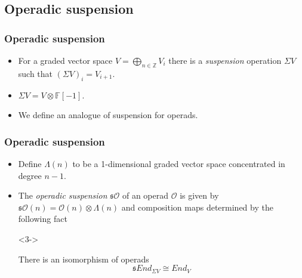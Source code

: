 \documentclass{beamer}
\theoremstyle{definition}
\newcommand{\Z}{\mathbb{Z}}
\begin{document}
\subsection{Operadic suspension}
\begin{frame}
\frametitle{Operadic suspension}
\begin{itemize}
\item<1-> For a graded vector space $V=\bigoplus_{n\in\Z} V_i$ there is a \emph{suspension} operation $\Sigma V$ such that $(\Sigma V)_i=V_{i+1}$. \item<2-> $\Sigma V=V\otimes \mathbb{F}[-1]$.
\item<3-> We define an analogue of suspension for operads.
\end{itemize}
\end{frame}

\begin{frame}
\frametitle{Operadic suspension}
\begin{itemize}
\item<1-> Define $\Lambda(n)$ to be a 1-dimensional graded vector space concentrated in degree $n-1$.
\item<2-> The \emph{operadic suspension} $\mathfrak{s}\mathcal{O}$ of an operad $\mathcal{O}$ is given by $\mathfrak{s}\mathcal{O}(n)=\mathcal{O}(n)\otimes \Lambda(n)$ and composition maps determined by the following fact
\item[]<3->
\begin{theorem}[Markl]
There is an isomorphism of operads
\[ \mathfrak{s}End_{\Sigma V}\cong End_V\]
\end{theorem}
\end{itemize}
\end{frame}
\end{document}
